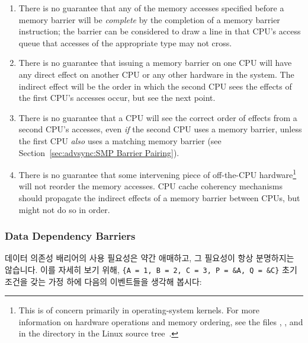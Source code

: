 \begin{enumerate}
\begin{enumerate}
\item	There is no guarantee that any of the memory accesses specified
	before a memory barrier will be \emph{complete} by the completion
	of a memory barrier instruction; the barrier can be considered
	to draw a line in that CPU's access queue that accesses of the
	appropriate type may not cross.
\item	There is no guarantee that issuing a memory barrier on one CPU
	will have any direct effect on another CPU or any other hardware
	in the system.	The indirect effect will be the order in which
	the second CPU sees the effects of the first CPU's accesses occur,
	but see the next point.
\item	There is no guarantee that a CPU will see the correct order
	of effects from a second CPU's accesses, even \emph{if} the second CPU
	uses a memory barrier, unless the first CPU \emph{also} uses a matching
	memory barrier (see
	Section~\ref{sec:advsync:SMP Barrier Pairing}).
\item	There is no guarantee that some intervening piece of off-the-CPU
	hardware\footnote{
		This is of concern primarily in operating-system kernels.
		For more information on hardware operations and memory
		ordering, see the files , ,
		and  in the  directory in
		the Linux source tree~\cite{Torvalds2.6kernel}.}
	will not reorder the memory accesses.  CPU cache
	coherency mechanisms should propagate the indirect effects of
	a memory barrier between CPUs, but might not do so in order.
\end{enumerate}
\fi

\subsubsection{Data Dependency Barriers}
\label{sec:advsync:Data Dependency Barriers}

데이터 의존성 배리어의 사용 필요성은 약간 애매하고, 그 필요성이 항상 분명하지는
않습니다.
이를 자세히 보기 위해, {\tt \{A = 1, B = 2, C = 3, P = \&A, Q = \&C\}} 초기
조건을 갖는 가정 하에 다음의 이벤트들을 생각해 봅시다:

\end{enumerate}
